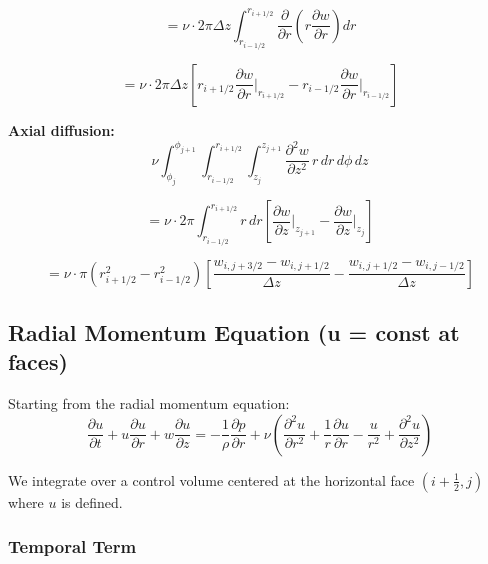 \begin{equation}
    = \nu \cdot 2\pi \Delta z \int_{r_{i-1/2}}^{r_{i+1/2}} \frac{\partial}{\partial r}\left(r\frac{\partial w}{\partial r}\right) dr
\end{equation}

\begin{equation}
    \boxed{= \nu \cdot 2\pi \Delta z \left[r_{i+1/2}\frac{\partial w}{\partial r}\bigg|_{r_{i+1/2}} - r_{i-1/2}\frac{\partial w}{\partial r}\bigg|_{r_{i-1/2}}\right]}
\end{equation}

\textbf{Axial diffusion:}
\begin{equation}
    \nu \int_{\phi_j}^{\phi_{j+1}} \int_{r_{i-1/2}}^{r_{i+1/2}} \int_{z_{j}}^{z_{j+1}} \frac{\partial^2 w}{\partial z^2} \, r\,dr\,d\phi\,dz
\end{equation}

\begin{equation}
    = \nu \cdot 2\pi \int_{r_{i-1/2}}^{r_{i+1/2}} r\,dr \left[\frac{\partial w}{\partial z}\bigg|_{z_{j+1}} - \frac{\partial w}{\partial z}\bigg|_{z_j}\right]
\end{equation}

\begin{equation}
    \boxed{= \nu \cdot \pi(r_{i+1/2}^2 - r_{i-1/2}^2) \left[\frac{w_{i,j+3/2} - w_{i,j+1/2}}{\Delta z} - \frac{w_{i,j+1/2} - w_{i,j-1/2}}{\Delta z}\right]}
\end{equation}

\subsection{Radial Momentum Equation (u = const at faces)}

Starting from the radial momentum equation:
\begin{equation}
    \frac{\partial u}{\partial t} + u\frac{\partial u}{\partial r} + w\frac{\partial u}{\partial z} = -\frac{1}{\rho}\frac{\partial p}{\partial r} + \nu\left(\frac{\partial^2 u}{\partial r^2} + \frac{1}{r}\frac{\partial u}{\partial r} - \frac{u}{r^2} + \frac{\partial^2 u}{\partial z^2}\right)
\end{equation}

We integrate over a control volume centered at the horizontal face $(i+\frac{1}{2}, j)$ where $u$ is defined.

\subsubsection{Temporal Term}

